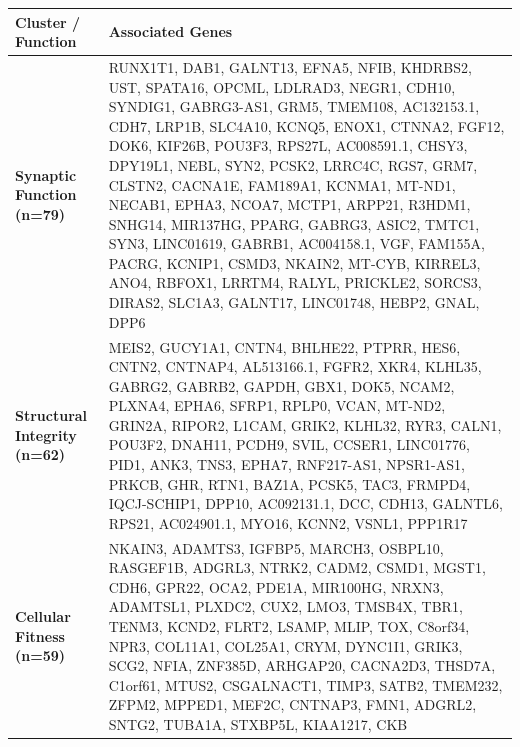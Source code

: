 \begin{longtable}{p{} p{}}
\hline
\textbf{Cluster / Function} & \textbf{Associated Genes} \\
\hline
\endhead
\textbf{Synaptic Function (n=79)} & RUNX1T1,  DAB1,  GALNT13,  EFNA5,  NFIB,  KHDRBS2,  UST,  SPATA16,  OPCML,  LDLRAD3,  NEGR1,  CDH10,  SYNDIG1,  GABRG3-AS1,  GRM5,  TMEM108,  AC132153.1,  CDH7,  LRP1B,  SLC4A10,  KCNQ5,  ENOX1,  CTNNA2,  FGF12,  DOK6,  KIF26B,  POU3F3,  RPS27L,  AC008591.1,  CHSY3,  DPY19L1,  NEBL,  SYN2,  PCSK2,  LRRC4C,  RGS7,  GRM7,  CLSTN2,  CACNA1E,  FAM189A1,  KCNMA1,  MT-ND1,  NECAB1,  EPHA3,  NCOA7,  MCTP1,  ARPP21,  R3HDM1,  SNHG14,  MIR137HG,  PPARG,  GABRG3,  ASIC2,  TMTC1,  SYN3,  LINC01619,  GABRB1,  AC004158.1,  VGF,  FAM155A,  PACRG,  KCNIP1,  CSMD3,  NKAIN2,  MT-CYB,  KIRREL3,  ANO4,  RBFOX1,  LRRTM4,  RALYL,  PRICKLE2,  SORCS3,  DIRAS2,  SLC1A3,  GALNT17,  LINC01748,  HEBP2,  GNAL,  DPP6 \\
\hline
\textbf{Structural Integrity (n=62)} & MEIS2,  GUCY1A1,  CNTN4,  BHLHE22,  PTPRR,  HES6,  CNTN2,  CNTNAP4,  AL513166.1,  FGFR2,  XKR4,  KLHL35,  GABRG2,  GABRB2,  GAPDH,  GBX1,  DOK5,  NCAM2,  PLXNA4,  EPHA6,  SFRP1,  RPLP0,  VCAN,  MT-ND2,  GRIN2A,  RIPOR2,  L1CAM,  GRIK2,  KLHL32,  RYR3,  CALN1,  POU3F2,  DNAH11,  PCDH9,  SVIL,  CCSER1,  LINC01776,  PID1,  ANK3,  TNS3,  EPHA7,  RNF217-AS1,  NPSR1-AS1,  PRKCB,  GHR,  RTN1,  BAZ1A,  PCSK5,  TAC3,  FRMPD4,  IQCJ-SCHIP1,  DPP10,  AC092131.1,  DCC,  CDH13,  GALNTL6,  RPS21,  AC024901.1,  MYO16,  KCNN2,  VSNL1,  PPP1R17 \\
\hline
\textbf{Cellular Fitness (n=59)} & NKAIN3,  ADAMTS3,  IGFBP5,  MARCH3,  OSBPL10,  RASGEF1B,  ADGRL3,  NTRK2,  CADM2,  CSMD1,  MGST1,  CDH6,  GPR22,  OCA2,  PDE1A,  MIR100HG,  NRXN3,  ADAMTSL1,  PLXDC2,  CUX2,  LMO3,  TMSB4X,  TBR1,  TENM3,  KCND2,  FLRT2,  LSAMP,  MLIP,  TOX,  C8orf34,  NPR3,  COL11A1,  COL25A1,  CRYM,  DYNC1I1,  GRIK3,  SCG2,  NFIA,  ZNF385D,  ARHGAP20,  CACNA2D3,  THSD7A,  C1orf61,  MTUS2,  CSGALNACT1,  TIMP3,  SATB2,  TMEM232,  ZFPM2,  MPPED1,  MEF2C,  CNTNAP3,  FMN1,  ADGRL2,  SNTG2,  TUBA1A,  STXBP5L,  KIAA1217,  CKB \\
\hline
\end{longtable}

